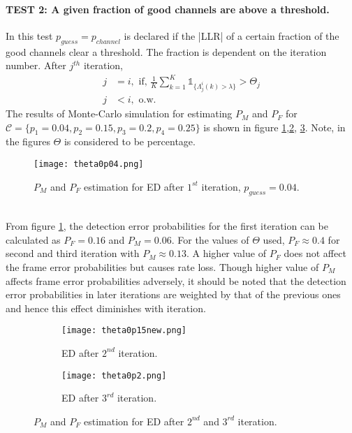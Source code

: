 \documentclass[
11pt, %
a4paper, %
oneside, %
headinclude,footinclude, %
BCOR5mm, %
]{scrartcl}
\begin{document}
\paragraph{TEST 2: A given fraction of good channels are above a threshold.}  
In this test $p_{guess}=p_{channel}$ is declared if the |LLR| of a certain fraction of the good channels clear a threshold. The fraction is dependent on the iteration number. After $j^{th}$ iteration,
\begin{align*}  
j &=i,
 \text{   if, } \frac{1}{K}\sum^K_{k=1} \mathbb{1}_{\{\Lambda_{j}^i(k) > \lambda\}} > \Theta_j \\
j & < i,  \text{ o.w. }
\end{align*} 
The results of Monte-Carlo simulation for estimating $P_M$ and $P_F$ for $\mathcal{C}=\{p_1=0.04,p_2=0.15,p_3=0.2,p_4=0.25\}$ is shown in figure \ref{fig:theta1},\ref{fig:theta2}, \ref{fig:theta3}. Note, in the figures $\Theta$ is considered to be percentage.
\begin{figure}[h]
 \begin{center}
    \texttt{[image: theta0p04.png]}
  \end{center}
  \caption{$P_M$ and $P_F$ estimation for ED after $1^{st}$ iteration, $p_{guess}=0.04$.}
  \label{fig:theta1}
\end{figure}\\
From figure \ref{fig:theta1}, the detection error probabilities for the first  iteration can be calculated as $P_F=0.16$ and $P_M=0.06$. For the values of $\Theta$ used, $P_F\approx0.4$  for second and third iteration with $P_M\approx0.13$. A higher value of $P_F$ does not affect the frame error probabilities but causes rate loss. Though higher value of $P_M$ affects frame error probabilities adversely, it should be noted that the detection error probabilities in later iterations are weighted by that of the previous ones and hence this effect diminishes with iteration.
\begin{figure}[h]
\centering
\begin{subfigure}{0.6\textwidth}
    \centering
    \texttt{[image: theta0p15new.png]}
    \caption{ED after $2^{nd}$ iteration.}
    \label{fig:theta2}
\end{subfigure}
\begin{subfigure}{0.6\textwidth}
    \centering
    \texttt{[image: theta0p2.png]}
    \caption{ED after $3^{rd}$ iteration.}
    \label{fig:theta3}
\end{subfigure}
\caption{$P_M$ and $P_F$ estimation for ED after $2^{nd}$ and $3^{rd}$ iteration.}
\label{fig:theta23}
\end{figure}
\end{document}
